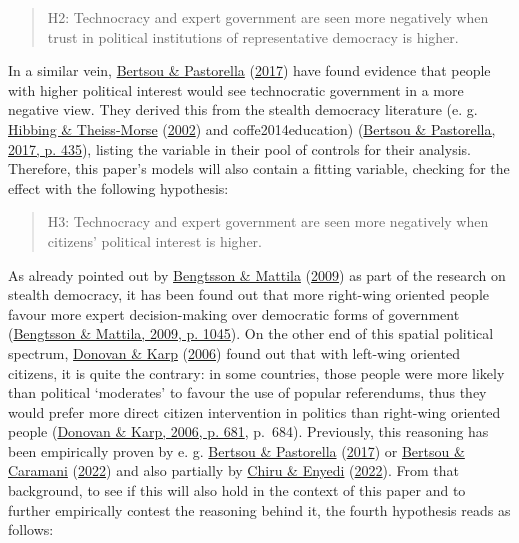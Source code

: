 \documentclass[
  12pt,
  english,
]{article}
\begin{document}
\begin{quote}
H2: Technocracy and expert government are seen more negatively when
trust in political institutions of representative democracy is higher.
\end{quote}

In a similar vein,
\protect\hyperlink{ref-bertsou2017technocratic}{Bertsou \& Pastorella}
(\protect\hyperlink{ref-bertsou2017technocratic}{2017}) have found
evidence that people with higher political interest would see
technocratic government in a more negative view. They derived this from
the stealth democracy literature (e. g.
\protect\hyperlink{ref-hibbing2002stealth}{Hibbing \& Theiss-Morse}
(\protect\hyperlink{ref-hibbing2002stealth}{2002}) and
coffe2014education)
(\protect\hyperlink{ref-bertsou2017technocratic}{Bertsou \& Pastorella,
2017, p. 435}), listing the variable in their pool of controls for their
analysis. Therefore, this paper's models will also contain a fitting
variable, checking for the effect with the following hypothesis:

\begin{quote}
H3: Technocracy and expert government are seen more negatively when
citizens' political interest is higher.
\end{quote}

As already pointed out by
\protect\hyperlink{ref-bengtsson2009direct}{Bengtsson \& Mattila}
(\protect\hyperlink{ref-bengtsson2009direct}{2009}) as part of the
research on stealth democracy, it has been found out that more
right-wing oriented people favour more expert decision-making over
democratic forms of government
(\protect\hyperlink{ref-bengtsson2009direct}{Bengtsson \& Mattila, 2009,
p. 1045}). On the other end of this spatial political spectrum,
\protect\hyperlink{ref-donovan2006popular}{Donovan \& Karp}
(\protect\hyperlink{ref-donovan2006popular}{2006}) found out that with
left-wing oriented citizens, it is quite the contrary: in some
countries, those people were more likely than political `moderates' to
favour the use of popular referendums, thus they would prefer more
direct citizen intervention in politics than right-wing oriented people
(\protect\hyperlink{ref-donovan2006popular}{Donovan \& Karp, 2006, p.
681}, p.~684). Previously, this reasoning has been empirically proven by
e. g. \protect\hyperlink{ref-bertsou2017technocratic}{Bertsou \&
Pastorella} (\protect\hyperlink{ref-bertsou2017technocratic}{2017}) or
\protect\hyperlink{ref-bertsou2022people}{Bertsou \& Caramani}
(\protect\hyperlink{ref-bertsou2022people}{2022}) and also partially by
\protect\hyperlink{ref-chiru2022wants}{Chiru \& Enyedi}
(\protect\hyperlink{ref-chiru2022wants}{2022}). From that background, to
see if this will also hold in the context of this paper and to further
empirically contest the reasoning behind it, the fourth hypothesis reads
as follows:
\end{document}
